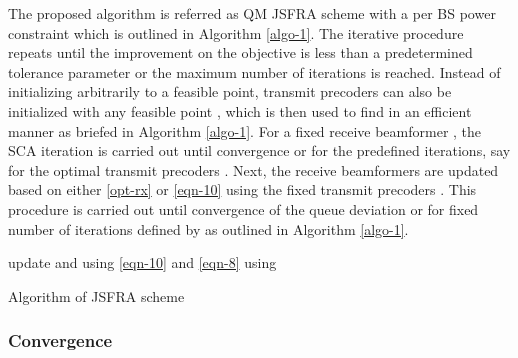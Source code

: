 The proposed algorithm is referred as \acl{QM} \ac{JSFRA} scheme with a per \ac{BS} power constraint which is outlined in Algorithm \ref{algo-1}. The iterative procedure repeats until the improvement on the objective is less than a predetermined tolerance parameter or the maximum number of iterations is reached. Instead of initializing  arbitrarily to a feasible point, transmit precoders can also be initialized with any feasible point , which is then used to find  in an efficient manner as briefed in Algorithm \ref{algo-1}. For a fixed receive beamformer , the \ac{SCA} iteration is carried out until convergence or for the predefined iterations, say  for the optimal transmit precoders . Next, the receive beamformers are updated based on either \eqref{opt-rx} or \eqref{eqn-10} using the fixed transmit precoders . This procedure is carried out until convergence of the queue deviation or for fixed number of iterations defined by  as outlined in Algorithm \ref{algo-1}.
{\allowdisplaybreaks
\begin{algorithm}
 \SetAlgoLined
 \DontPrintSemicolon
 \BlankLine
 update  and  using \eqref{eqn-10} and \eqref{eqn-8} using \;
 \caption{Algorithm of \acs{JSFRA} scheme}
 \label{algo-1}
\end{algorithm}
}
\subsubsection*{Convergence}

